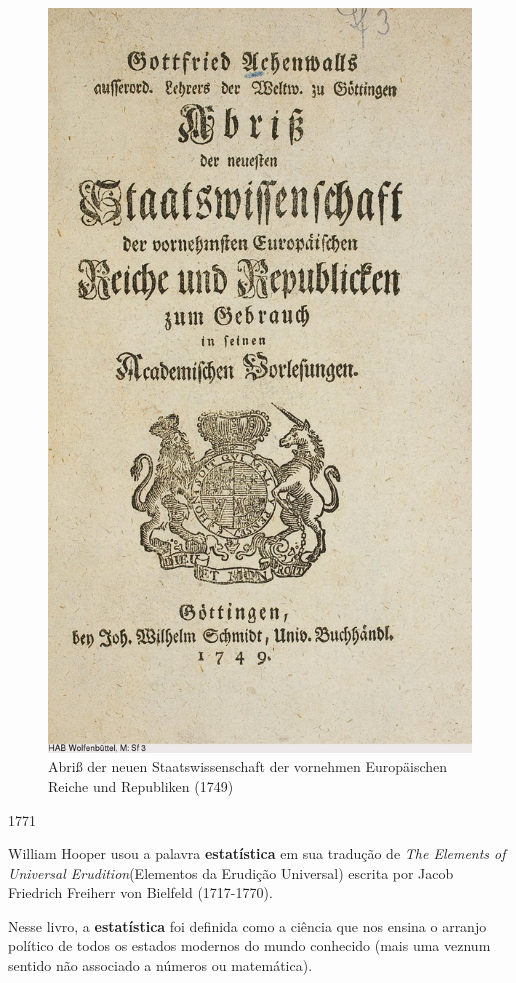 \documentclass[
]{book}
\begin{document}
\begin{figure}

{\centering \includegraphics[width=0.75\linewidth]{images1/gottfried} 

}

\caption{Abriß der neuen Staatswissenschaft der vornehmen Europäischen Reiche und Republiken (1749)}\label{fig:unnamed-chunk-7}
\end{figure}

\hfill\break

1771

\hfill\break

William Hooper usou a palavra \textbf{estatística} em sua tradução de \emph{The Elements of Universal Erudition}(Elementos da Erudição Universal) escrita por Jacob Friedrich Freiherr von Bielfeld (1717-1770).

Nesse livro, a \textbf{estatística} foi definida como a ciência que nos ensina o arranjo político de todos os estados modernos do mundo conhecido (mais uma veznum sentido não associado a números ou matemática).
\end{document}
